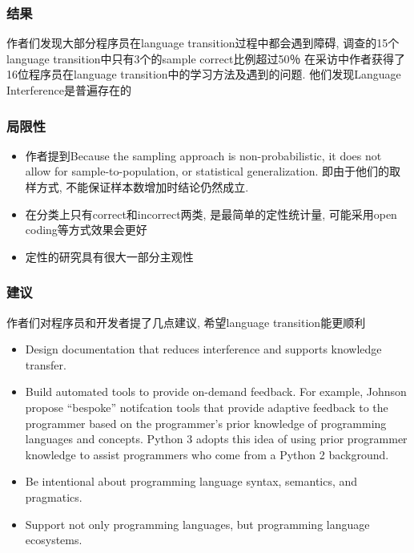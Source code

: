\subsubsection{结果}
作者们发现大部分程序员在language transition过程中都会遇到障碍, 调查的15个language transition中只有3个的sample correct比例超过50％
在采访中作者获得了16位程序员在language transition中的学习方法及遇到的问题. 他们发现Language Interference是普遍存在的

\subsubsection{局限性}

\begin{itemize}
    \item 作者提到Because the sampling approach is non-probabilistic, it does not allow for sample-to-population, or statistical generalization. 即由于他们的取样方式, 不能保证样本数增加时结论仍然成立.
    \item 在分类上只有correct和incorrect两类, 是最简单的定性统计量, 可能采用open coding等方式效果会更好
    \item 定性的研究具有很大一部分主观性
\end{itemize}

\subsubsection{建议}
作者们对程序员和开发者提了几点建议, 希望language transition能更顺利
\begin{itemize}
    \item Design documentation that reduces interference and supports knowledge transfer.
    \item Build automated tools to provide on-demand feedback. For example, Johnson propose “bespoke” notifcation tools that provide adaptive feedback to the programmer based on the programmer’s prior knowledge of programming languages and concepts. Python 3 adopts this idea of using prior programmer knowledge to assist programmers who come from a Python 2 background.
    \item Be intentional about programming language syntax, semantics, and pragmatics. 
    \item Support not only programming languages, but programming language ecosystems.
\end{itemize}